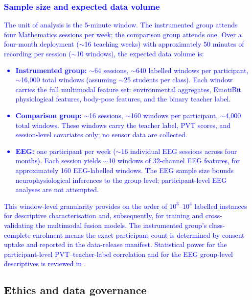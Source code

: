 \textcolor{blue}{\subsubsection{Sample size and expected data volume}}

\textcolor{blue}{The unit of analysis is the 5-minute window. The instrumented group attends four Mathematics sessions per week; the comparison group attends one. Over a four-month deployment ($\sim$16 teaching weeks) with approximately 50 minutes of recording per session ($\sim$10 windows), the expected data volume is:}

\textcolor{blue}{\begin{itemize}[leftmargin=*, itemsep=1pt]
  \item \textbf{Instrumented group:} $\sim$64 sessions, $\sim$640 labelled windows per participant, $\sim$16,000 total windows (assuming $\sim$25 students per class). Each window carries the full multimodal feature set: environmental aggregates, EmotiBit physiological features, body-pose features, and the binary teacher label.
  \item \textbf{Comparison group:} $\sim$16 sessions, $\sim$160 windows per participant, $\sim$4,000 total windows. These windows carry the teacher label, PVT scores, and session-level covariates only; no sensor data are collected.
  \item \textbf{EEG:} one participant per week ($\sim$16 individual EEG sessions across four months). Each session yields $\sim$10 windows of 32-channel EEG features, for approximately 160 EEG-labelled windows. The EEG sample size bounds neurophysiological inferences to the group level; participant-level EEG analyses are not attempted.
\end{itemize}}

\textcolor{blue}{This window-level granularity provides on the order of $10^3$--$10^4$ labelled instances for descriptive characterisation and, subsequently, for training and cross-validating the multimodal fusion models. The instrumented group's class-complete enrolment means the exact participant count is determined by consent uptake and reported in the data-release manifest. Statistical power for the participant-level PVT--teacher-label correlation and for the EEG group-level descriptives is reviewed in .}

\subsection{Ethics and data governance}\label{subsec:ethics}

